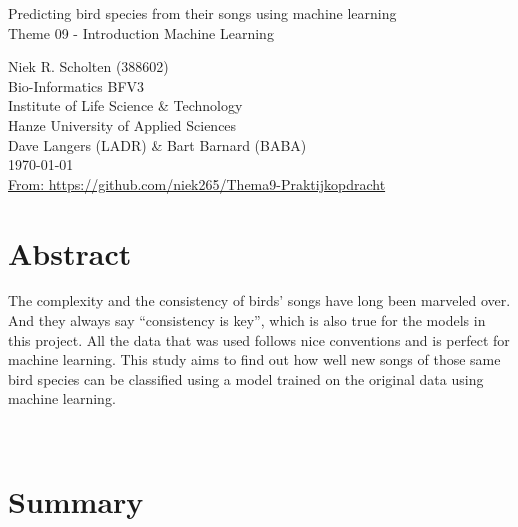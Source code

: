 \null
\thispagestyle{empty}
\addtocounter{page}{-1}
\newpage

\begin{center}


    \Huge{Predicting bird species from their songs using machine learning}\\
    \vspace{\baselineskip}
    \LARGE{Theme 09 - Introduction Machine Learning}\\
    \vspace{\baselineskip}

\end{center}
\vspace{\baselineskip}

\normalsize
\vspace*{\fill}
\begin{flushright}
    Niek R. Scholten (388602)\\
    Bio-Informatics BFV3\\
    Institute of Life Science \& Technology\\
    Hanze University of Applied Sciences\\
    Dave Langers (LADR) \& Bart Barnard (BABA)\\
    \today\\
    \href{https://github.com/niek265/Thema9-Praktijkopdracht}{From: https://github.com/niek265/Thema9-Praktijkopdracht}
\end{flushright}
\newpage

\section*{Abstract}

The complexity and the consistency of birds' songs have long been marveled over.
And they always say ``consistency is key'', which is also true for the models in this project.
All the data that was used follows nice conventions and is perfect for machine learning.
This study aims to find out how well new songs of those same bird species can be classified using a model trained on the original data using machine learning.

\label{sec:abstract}~
\newpage

\section*{Summary}

